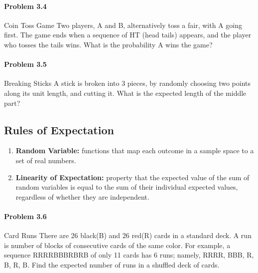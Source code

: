 \documentclass{article}
\begin{document}
\paragraph{Problem 3.4} Coin Toss Game
\newline
\newline
Two players, A and B, alternatively toss a fair, with A going first. The game ends when a sequence of HT (head tails) appears, and the player who tosses the tails wins. What is the probability A wins the game?
\newline
\newline
\paragraph{Problem 3.5} Breaking Sticks
\newline
\newline
A stick is broken into 3 pieces, by randomly choosing two points along its unit length, and cutting it. What is the expected length of the middle part?
\newline
\newline
\subsection{Rules of Expectation}
\begin{enumerate}
    \item{\textbf{Random Variable:} functions that map each outcome in a sample space to a set of real numbers.}

    \item{\textbf{Linearity of Expectation:} property that the expected value of the sum of random variables is equal to the sum of their individual expected values, regardless of whether they are independent.}
\end{enumerate}

\newline
\newline

\paragraph{Problem 3.6} Card Runs
\newline
\newline
There are 26 black(B) and 26 red(R) cards in a standard deck. A run is number of blocks of consecutive cards of the same color. For example, a sequence RRRRBBBRBRB of only 11 cards has 6 runs; namely, RRRR, BBB, R, B, R, B. Find the expected number of runs in a shuffled deck of cards.
\newline
\newline
\end{document}
